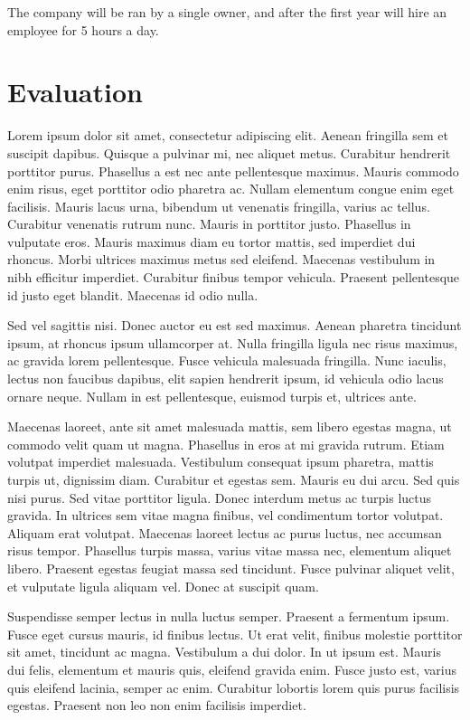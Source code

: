 \documentclass[12pt, letterpaper]{article}
\begin{document}
The company will be ran by a single owner, and after the first year will hire an employee for 5 hours a day.

\section{Evaluation}
Lorem ipsum dolor sit amet, consectetur adipiscing elit. Aenean fringilla sem et suscipit dapibus. Quisque a pulvinar mi, nec aliquet metus. Curabitur hendrerit porttitor purus. Phasellus a est nec ante pellentesque maximus. Mauris commodo enim risus, eget porttitor odio pharetra ac. Nullam elementum congue enim eget facilisis. Mauris lacus urna, bibendum ut venenatis fringilla, varius ac tellus. Curabitur venenatis rutrum nunc. Mauris in porttitor justo. Phasellus in vulputate eros. Mauris maximus diam eu tortor mattis, sed imperdiet dui rhoncus. Morbi ultrices maximus metus sed eleifend. Maecenas vestibulum in nibh efficitur imperdiet. Curabitur finibus tempor vehicula. Praesent pellentesque id justo eget blandit. Maecenas id odio nulla.

Sed vel sagittis nisi. Donec auctor eu est sed maximus. Aenean pharetra tincidunt ipsum, at rhoncus ipsum ullamcorper at. Nulla fringilla ligula nec risus maximus, ac gravida lorem pellentesque. Fusce vehicula malesuada fringilla. Nunc iaculis, lectus non faucibus dapibus, elit sapien hendrerit ipsum, id vehicula odio lacus ornare neque. Nullam in est pellentesque, euismod turpis et, ultrices ante.

Maecenas laoreet, ante sit amet malesuada mattis, sem libero egestas magna, ut commodo velit quam ut magna. Phasellus in eros at mi gravida rutrum. Etiam volutpat imperdiet malesuada. Vestibulum consequat ipsum pharetra, mattis turpis ut, dignissim diam. Curabitur et egestas sem. Mauris eu dui arcu. Sed quis nisi purus. Sed vitae porttitor ligula. Donec interdum metus ac turpis luctus gravida. In ultrices sem vitae magna finibus, vel condimentum tortor volutpat. Aliquam erat volutpat. Maecenas laoreet lectus ac purus luctus, nec accumsan risus tempor. Phasellus turpis massa, varius vitae massa nec, elementum aliquet libero. Praesent egestas feugiat massa sed tincidunt. Fusce pulvinar aliquet velit, et vulputate ligula aliquam vel. Donec at suscipit quam.

Suspendisse semper lectus in nulla luctus semper. Praesent a fermentum ipsum. Fusce eget cursus mauris, id finibus lectus. Ut erat velit, finibus molestie porttitor sit amet, tincidunt ac magna. Vestibulum a dui dolor. In ut ipsum est. Mauris dui felis, elementum et mauris quis, eleifend gravida enim. Fusce justo est, varius quis eleifend lacinia, semper ac enim. Curabitur lobortis lorem quis purus facilisis egestas. Praesent non leo non enim facilisis imperdiet.
\end{document}
